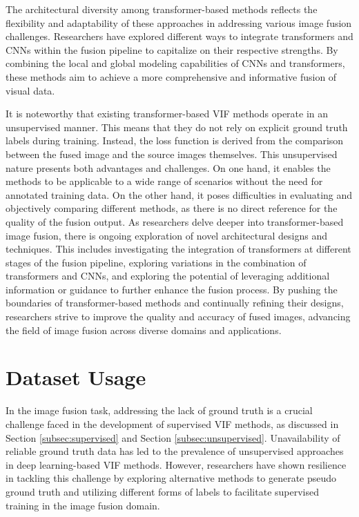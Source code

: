 The architectural diversity among transformer-based methods reflects the flexibility and adaptability of these approaches in addressing various image fusion challenges. Researchers have explored different ways to integrate transformers and CNNs within the fusion pipeline to capitalize on their respective strengths. By combining the local and global modeling capabilities of CNNs and transformers, these methods aim to achieve a more comprehensive and informative fusion of visual data. 

It is noteworthy that existing transformer-based VIF methods operate in an unsupervised manner. This means that they do not rely on explicit ground truth labels during training. Instead, the loss function is derived from the comparison between the fused image and the source images themselves. This unsupervised nature presents both advantages and challenges. On one hand, it enables the methods to be applicable to a wide range of scenarios without the need for annotated training data. On the other hand, it poses difficulties in evaluating and objectively comparing different methods, as there is no direct reference for the quality of the fusion output. As researchers delve deeper into transformer-based image fusion, there is ongoing exploration of novel architectural designs and techniques. This includes investigating the integration of transformers at different stages of the fusion pipeline, exploring variations in the combination of transformers and CNNs, and exploring the potential of leveraging additional information or guidance to further enhance the fusion process. By pushing the boundaries of transformer-based methods and continually refining their designs, researchers strive to improve the quality and accuracy of fused images, advancing the field of image fusion across diverse domains and applications.

\section{Dataset Usage}
\label{sec:Dataset}


In the image fusion task, addressing the lack of ground truth is a crucial challenge faced in the development of supervised VIF methods, as discussed in Section \ref{subsec:supervised} and Section \ref{subsec:unsupervised}. Unavailability of reliable ground truth data has led to the prevalence of unsupervised approaches in deep learning-based VIF methods. However, researchers have shown resilience in tackling this challenge by exploring alternative methods to generate pseudo ground truth and utilizing different forms of labels to facilitate supervised training in the image fusion domain.

